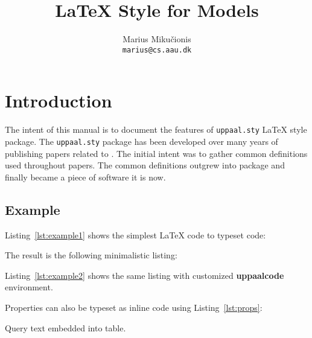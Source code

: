 \documentclass[english,paper=a4,final]{article}
\title{\LaTeX{} Style for \uppaal Models}
\author{Marius Miku\v{c}ionis \\ {\tt marius@cs.aau.dk}}
\begin{document}
\maketitle


\section{Introduction}
The intent of this manual is to document the features of {\tt uppaal.sty} \LaTeX{} style package.
The {\tt uppaal.sty} package has been developed over many years of publishing papers related to \uppaal.
The initial intent was to gather common definitions used throughout papers.
The common definitions outgrew into package and finally became a piece of software it is now.

\subsection{Example}
Listing~\ref{lst:example1} shows the simplest \LaTeX{} code to typeset \uppaal code:



The result is the following minimalistic listing:


Listing~\ref{lst:example2} shows the same listing with customized {\bf uppaalcode} environment.






Properties can also be typeset as inline code using Listing~\ref{lst:props}:\\
\begin{table}
  \centering
  \caption{Query text embedded into table.}
  
\end{table}


\end{document}
